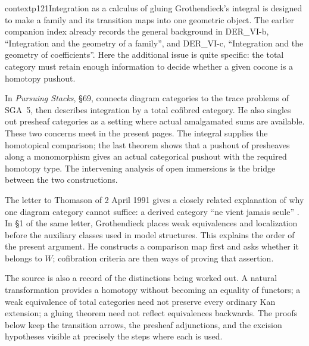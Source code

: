 \begin{dcomment}{context}{p121}{Integration as a calculus of gluing}
Grothendieck's integral is designed to make a family and its transition maps into one geometric object. The earlier companion index already records the general background in DER\_VI-b, ``Integration and the geometry of a family'', and DER\_VI-c, ``Integration and the geometry of coefficients''. Here the additional issue is quite specific: the total category must retain enough information to decide whether a given cocone is a homotopy pushout.

In \emph{Pursuing Stacks}, \S69, \citet{Grothendieck1983} connects diagram categories to the trace problems of SGA~5, then describes integration by a total cofibred category. He also singles out presheaf categories as a setting where actual amalgamated sums are available. These two concerns meet in the present pages. The integral supplies the homotopical comparison; the last theorem shows that a pushout of presheaves along a monomorphism gives an actual categorical pushout with the required homotopy type. The intervening analysis of open immersions is the bridge between the two constructions.

The letter to Thomason of 2 April 1991 gives a closely related explanation of why one diagram category cannot suffice: a derived category ``ne vient jamais seule'' \citep[\S2]{Grothendieck1991Letter}. In \S1 of the same letter, Grothendieck places weak equivalences and localization before the auxiliary classes used in model structures. This explains the order of the present argument. He constructs a comparison map first and asks whether it belongs to $W$; cofibration criteria are then ways of proving that assertion.

The source is also a record of the distinctions being worked out. A natural transformation provides a homotopy without becoming an equality of functors; a weak equivalence of total categories need not preserve every ordinary Kan extension; a gluing theorem need not reflect equivalences backwards. The proofs below keep the transition arrows, the presheaf adjunctions, and the excision hypotheses visible at precisely the steps where each is used.
\end{dcomment}

